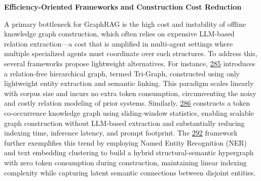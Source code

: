 \documentclass[11pt]{article}
\begin{document}
\textbf{Efficiency-Oriented Frameworks and Construction Cost Reduction}

A primary bottleneck for GraphRAG is the high cost and instability of offline knowledge graph construction, which often relies on expensive LLM-based relation extraction---a cost that is amplified in multi-agent settings where multiple specialized agents must coordinate over such structures. To address this, several frameworks propose lightweight alternatives. For instance, \href{LinearRAG\%20Linear\%20Graph\%20Retrieval\%20Augmented\%20Generation\%20on\%20Large-scale\%20Corpora}{285} introduces a relation-free hierarchical graph, termed Tri-Graph, constructed using only lightweight entity extraction and semantic linking. This paradigm scales linearly with corpus size and incurs no extra token consumption, circumventing the noisy and costly relation modeling of prior systems. Similarly, \href{Efficient\%20Retrieval-Augmented\%20Generation\%20via\%20Token\%20Co-occurrence\%20Graphs}{286} constructs a token co-occurrence knowledge graph using sliding-window statistics, enabling scalable graph construction without LLM-based extraction and substantially reducing indexing time, inference latency, and prompt footprint. The \href{EHRAG\%20Bridging\%20Semantic\%20Gaps\%20in\%20Lightweight\%20GraphRAG\%20via\%20Hybrid\%20Hypergraph\%20Construction\%20and\%20Retrieval}{292} framework further exemplifies this trend by employing Named Entity Recognition (NER) and text embedding clustering to build a hybrid structural-semantic hypergraph with zero token consumption during construction, maintaining linear indexing complexity while capturing latent semantic connections between disjoint entities.
\end{document}
